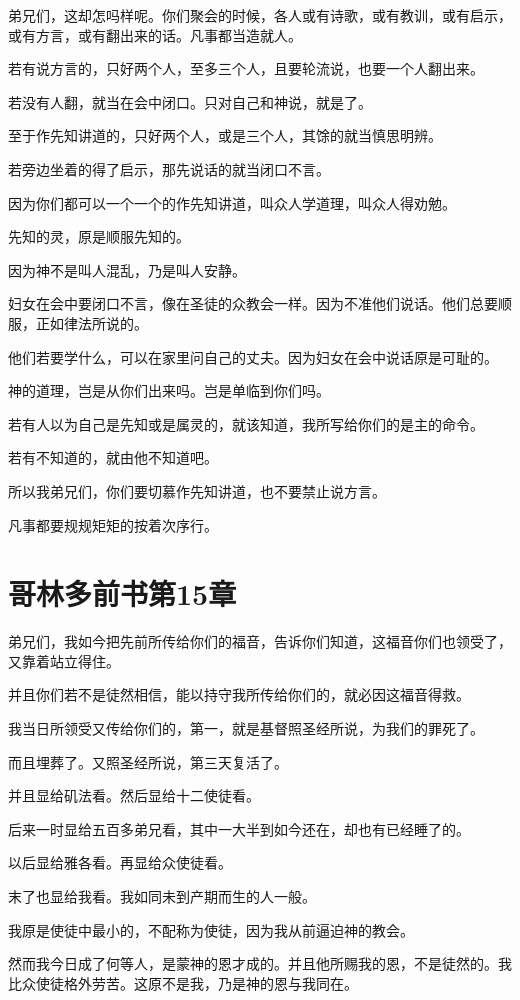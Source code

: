 \documentclass[12pt,oneside]{book}
\begin{document}
弟兄们，这却怎吗样呢。你们聚会的时候，各人或有诗歌，或有教训，或有启示，或有方言，或有翻出来的话。凡事都当造就人。

若有说方言的，只好两个人，至多三个人，且要轮流说，也要一个人翻出来。

若没有人翻，就当在会中闭口。只对自己和神说，就是了。

至于作先知讲道的，只好两个人，或是三个人，其馀的就当慎思明辨。

若旁边坐着的得了启示，那先说话的就当闭口不言。

因为你们都可以一个一个的作先知讲道，叫众人学道理，叫众人得劝勉。

先知的灵，原是顺服先知的。

因为神不是叫人混乱，乃是叫人安静。

妇女在会中要闭口不言，像在圣徒的众教会一样。因为不准他们说话。他们总要顺服，正如律法所说的。

他们若要学什么，可以在家里问自己的丈夫。因为妇女在会中说话原是可耻的。

神的道理，岂是从你们出来吗。岂是单临到你们吗。

若有人以为自己是先知或是属灵的，就该知道，我所写给你们的是主的命令。

若有不知道的，就由他不知道吧。

所以我弟兄们，你们要切慕作先知讲道，也不要禁止说方言。

凡事都要规规矩矩的按着次序行。

\chapter{哥林多前书第15章}
弟兄们，我如今把先前所传给你们的福音，告诉你们知道，这福音你们也领受了，又靠着站立得住。

并且你们若不是徒然相信，能以持守我所传给你们的，就必因这福音得救。

我当日所领受又传给你们的，第一，就是基督照圣经所说，为我们的罪死了。

而且埋葬了。又照圣经所说，第三天复活了。

并且显给矶法看。然后显给十二使徒看。

后来一时显给五百多弟兄看，其中一大半到如今还在，却也有已经睡了的。

以后显给雅各看。再显给众使徒看。

末了也显给我看。我如同未到产期而生的人一般。

我原是使徒中最小的，不配称为使徒，因为我从前逼迫神的教会。

然而我今日成了何等人，是蒙神的恩才成的。并且他所赐我的恩，不是徒然的。我比众使徒格外劳苦。这原不是我，乃是神的恩与我同在。
\end{document}
